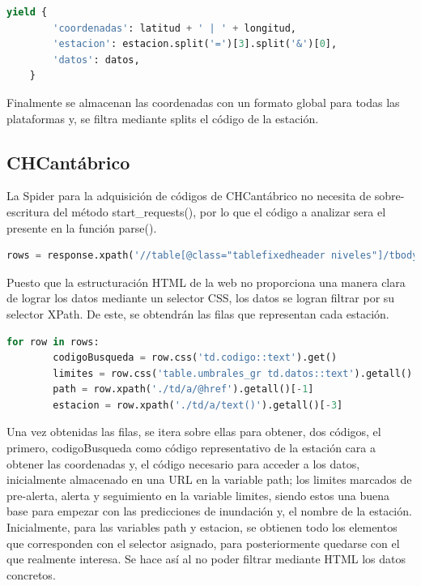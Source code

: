 \begin{lstlisting}[language=Python, caption={Guardado de datos de Aemet Data Spider}]
	yield {
		'coordenadas': latitud + ' | ' + longitud,
		'estacion': estacion.split('=')[3].split('&')[0],
		'datos': datos,
	}
\end{lstlisting}

Finalmente se almacenan las coordenadas con un formato global para todas las plataformas y, se filtra mediante splits el código de la estación.

\subsection{CHCantábrico}
La Spider para la adquisición de códigos de CHCantábrico no necesita de sobre-escritura del método start\_requests(), por lo que el código a analizar sera el presente en la función parse().

\begin{lstlisting}[language=Python, caption={Selector Chcantabrico Code Spider}]
	rows = response.xpath('//table[@class="tablefixedheader niveles"]/tbody/tr')
\end{lstlisting}

Puesto que la estructuración HTML de la web no proporciona una manera clara de lograr los datos mediante un selector CSS, los datos se logran filtrar por su selector XPath. De este, se obtendrán las filas que representan cada estación.

\begin{lstlisting}[language=Python, caption={Trabajar sobre los datos de Chcantabrico Code Spider}]
	for row in rows:
		codigoBusqueda = row.css('td.codigo::text').get()
		limites = row.css('table.umbrales_gr td.datos::text').getall()
		path = row.xpath('./td/a/@href').getall()[-1]
		estacion = row.xpath('./td/a/text()').getall()[-3]
\end{lstlisting}

Una vez obtenidas las filas, se itera sobre ellas para obtener, dos códigos, el primero, codigoBusqueda como código representativo de la estación cara a obtener las coordenadas y, el código necesario para acceder a los datos, inicialmente almacenado en una URL en la variable path; los limites marcados de pre-alerta, alerta y seguimiento en la variable limites, siendo estos una buena base para empezar con las predicciones de inundación y, el nombre de la estación.\newline
\newline
Inicialmente, para las variables path y estacion, se obtienen todo los elementos que corresponden con el selector asignado, para posteriormente quedarse con el que realmente interesa. Se hace así al no poder filtrar mediante HTML los datos concretos.

